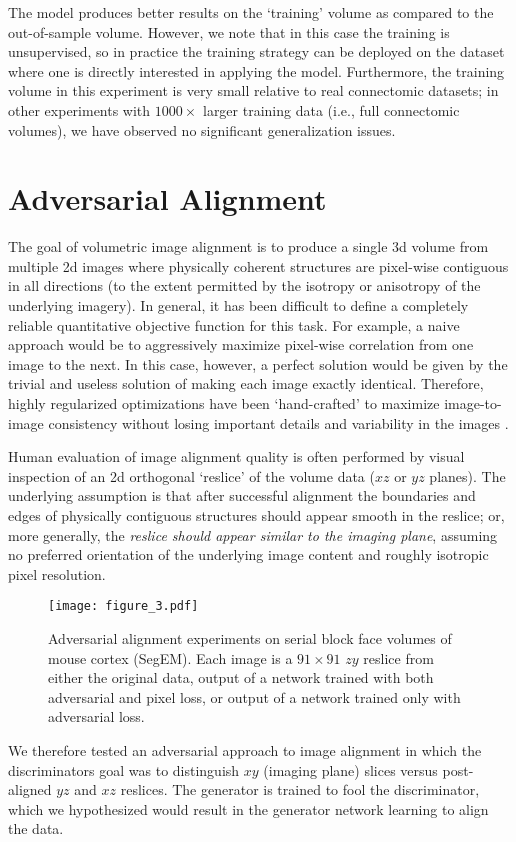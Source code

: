 \documentclass{article} %
\begin{document}
The model produces better results on the `training' volume as compared to the  out-of-sample volume. However, we note that in this case the training is unsupervised, so in practice the training strategy can be deployed on the dataset where one is directly interested in applying the model. Furthermore, the training volume in this experiment is very small relative to real connectomic datasets; in other experiments with $1000\times$ larger training data (i.e., full connectomic volumes), we have observed no significant generalization issues. 

\section{Adversarial Alignment}
The goal of volumetric image alignment is to produce a single 3d volume from multiple 2d images where physically coherent structures are pixel-wise contiguous in all directions (to the extent permitted by the isotropy or anisotropy of the underlying imagery). In general, it has been difficult to define a completely reliable quantitative objective function for this task. For example, a naive approach would be to aggressively maximize pixel-wise correlation from one image to the next. In this case, however, a perfect solution would be given by the trivial and useless solution of making each image exactly identical. Therefore, highly regularized optimizations have been `hand-crafted' to maximize image-to-image consistency without losing important details and variability in the images \cite{saalfeld2012elastic}. 

Human evaluation of image alignment quality is often performed by visual inspection of an 2d orthogonal `reslice' of the volume data ($xz$ or $yz$ planes). The underlying assumption is that after successful alignment the boundaries and edges of physically contiguous structures should appear smooth in the reslice; or, more generally, the \emph{reslice should appear similar to the imaging plane}, assuming no preferred orientation of the underlying image content and roughly isotropic pixel resolution.
\begin{figure}
    \centering
    \texttt{[image: figure\_3.pdf]}
    \caption{Adversarial alignment experiments on serial block face volumes of mouse cortex (SegEM). Each image is a $91\times91$ $zy$ reslice from either the original data, output of a network trained with both adversarial and pixel loss, or output of a network trained only with adversarial loss.}
    \label{fig:experiments_adversarial_alignment_segem}
\end{figure}
We therefore tested an adversarial approach to image alignment in which the discriminators goal was to distinguish $xy$ (imaging plane) slices versus post-aligned $yz$ and $xz$ reslices. The generator is trained to fool the discriminator, which we hypothesized would result in the generator network learning to align the data. 
\end{document}
